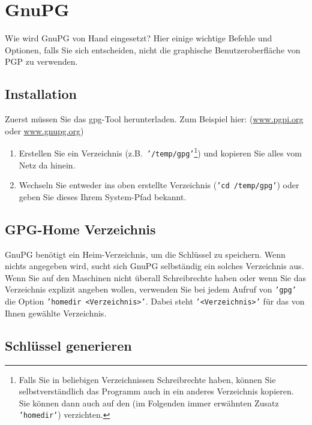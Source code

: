 \section{GnuPG}
\label{sec:gnupg}

Wie wird GnuPG von Hand eingesetzt? Hier einige wichtige Befehle und Optionen,
falls Sie sich entscheiden, nicht die graphische Benutzeroberfläche von PGP zu verwenden.

\subsection{Installation}
\label{subsec:gnupg-installation}

Zuerst müssen Sie das gpg-Tool herunterladen. Zum Beispiel hier: (\href{https://www.openpgp.org}{www.pgpi.org} oder
\href{https://www.gnupg.org}{www.gnupg.org})

\begin{enumerate}
    \item Erstellen Sie ein Verzeichnis (z.B.~\texttt{'/temp/gpg'}\footnote{Falls Sie in
    beliebigen Verzeichnissen Schreibrechte haben, können Sie selbstverständlich das
    Programm auch in ein anderes Verzeichnis kopieren. Sie können dann auch auf den
    (im Folgenden immer erwähnten Zusatz \texttt{'homedir'}) verzichten.}) und kopieren
    Sie alles vom Netz da hinein.

    \item Wechseln Sie entweder ins oben erstellte Verzeichnis (\texttt{'cd /temp/gpg'})
    oder geben Sie dieses Ihrem System-Pfad bekannt.

\end{enumerate}

\subsection{GPG-Home Verzeichnis}
\label{subsec:gpg-home}

GnuPG benötigt ein Heim-Verzeichnis, um die Schlüssel zu speichern. Wenn nichts angegeben
wird, sucht sich GnuPG selbständig ein solches Verzeichnis aus. Wenn Sie auf den
Maschinen nicht überall Schreibrechte haben oder wenn Sie das Verzeichnis explizit
angeben wollen, verwenden Sie bei jedem Aufruf von \texttt{'gpg'} die Option
\texttt{'homedir <Verzeichnis>'}. Dabei steht \texttt{'<Verzeichnis>'} für das von
Ihnen gewählte Verzeichnis.

\subsection{Schlüssel generieren}
\label{subsec:gpg-key-generieren}

